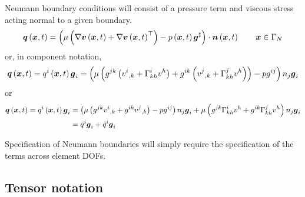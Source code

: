 Neumann boundary conditions will consist of a pressure term and
viscous stress acting normal to a given boundary.
\begin{equation}
  \fnof{\vectr{q}}{\vectr{x},t} =
  \dotprod{\pbrac{\mu\pbrac{\gradient{}{\fnof{\vectr{v}}{\vectr{x},t}}+\transpose{\gradient{}{\fnof{\vectr{v}}{\vectr{x},t}}}}-
      \fnof{p}{\vectr{x},t}\sharptensor{\vectr{g}}}}{\fnof{\vectr{n}}{\vectr{x},t}}  \quad\quad \vectr{x}\in\Gamma_{N}
  \label{eqn:NSENeumannBC}  
\end{equation}
or, in component notation,
\begin{equation}
    \boldsymbol{q} \left(  \boldsymbol{x} ,t \right) = q^{i}\left(  \boldsymbol{x} ,t \right)  \boldsymbol{g} _{i}=
  \left( \mu\left( 
    g^{jk}\left(  {v^{i}}_{,k} + \Gamma^{i}_{kh} v^{h} \right)+g^{ik}\left(  {v^{j}}_{,k} + \Gamma^{j}_{kh} v^{h} \right) \right)-pg^{ij} \right)n_{j} \boldsymbol{g} _{i}
\end{equation}
or
\begin{equation}
  \begin{split}
      \boldsymbol{q} \left(  \boldsymbol{x} ,t \right) = q^{i}\left(  \boldsymbol{x} ,t \right)  \boldsymbol{g} _{i}&=\left( \mu\left( 
      g^{jk} {v^{i}}_{,k} +g^{ik} {v^{j}}_{,k}  \right)-pg^{ij} \right)n_{j} \boldsymbol{g} _{i}+\mu
    \left( g^{jk} \Gamma^{i}_{kh} v^{h}+g^{ik} \Gamma^{j}_{kh} v^{h} \right)n_{j} \boldsymbol{g} _{i}\\
    &=\bar{q}^{i} \boldsymbol{g} _{i}+\tilde{q}^{i} \boldsymbol{g} _{i}
  \end{split}
\end{equation}

Specification of Neumann boundaries will simply require the specification of
the terms across element DOFs.

\subsection{Tensor notation}

